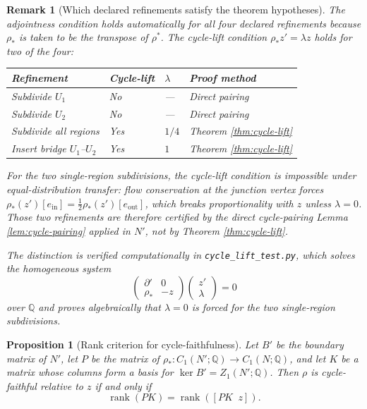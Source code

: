 \documentclass[11pt]{article}
\newtheorem{proposition}[theorem]{Proposition}
\newtheorem{remark}[theorem]{Remark}
\newcommand{\Q}{\mathbb{Q}}
\begin{document}
\begin{remark}[Which declared refinements satisfy the theorem hypotheses]
The adjointness condition holds automatically for all four declared refinements
because \(\rho_*\) is taken to be the transpose of \(\rho^*\).
The cycle-lift condition \(\rho_*z'=\lambda z\) holds for two of the four:

\begin{center}
\begin{tabular}{llll}
\toprule
Refinement & Cycle-lift & \(\lambda\) & Proof method \\
\midrule
Subdivide \(U_1\) & No & --- & Direct pairing \\
Subdivide \(U_2\) & No & --- & Direct pairing \\
Subdivide all regions & Yes & \(1/4\) & Theorem \ref{thm:cycle-lift} \\
Insert bridge \(U_1\)--\(U_2\) & Yes & \(1\) & Theorem \ref{thm:cycle-lift} \\
\bottomrule
\end{tabular}
\end{center}

For the two single-region subdivisions, the cycle-lift condition is impossible
under equal-distribution transfer: flow conservation at the junction vertex
forces \(\rho_*(z')[e_{\mathrm{in}}] = \tfrac{1}{2}\rho_*(z')[e_{\mathrm{out}}]\),
which breaks proportionality with \(z\) unless \(\lambda=0\).
Those two refinements are therefore certified by the direct cycle-pairing
Lemma \ref{lem:cycle-pairing} applied in \(N'\), not by Theorem
\ref{thm:cycle-lift}.

The distinction is verified computationally in
\texttt{cycle\_lift\_test.py}, which solves the homogeneous system
\[
\begin{pmatrix}\partial' & 0 \\ \rho_* & -z\end{pmatrix}
\begin{pmatrix}z'\\\lambda\end{pmatrix}=0
\]
over \(\Q\) and proves algebraically that \(\lambda=0\) is forced
for the two single-region subdivisions.
\end{remark}

\begin{proposition}[Rank criterion for cycle-faithfulness]\label{prop:rank-criterion}
Let \(B'\) be the boundary matrix of \(N'\), let \(P\) be the matrix of
\(\rho_*:C_1(N';\Q)\to C_1(N;\Q)\), and let \(K\) be a matrix whose columns
form a basis for \(\ker B'=Z_1(N';\Q)\). Then \(\rho\) is cycle-faithful
relative to \(z\) if and only if
\[
\operatorname{rank}(PK)=\operatorname{rank}([PK\;\;z]).
\]
\end{proposition}
\end{document}

